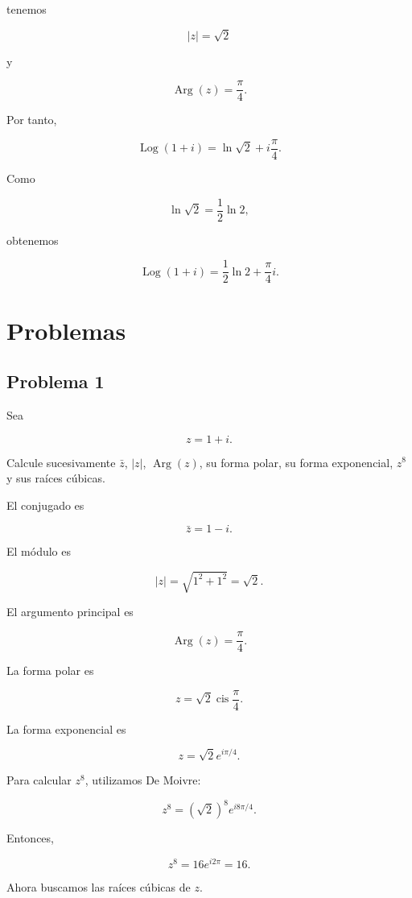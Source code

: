 \documentclass[12pt]{article}
\begin{document}
tenemos

\[
|z|=\sqrt2
\]

y

\[
\operatorname{Arg}(z)=\frac{\pi}{4}.
\]

Por tanto,

\[
\operatorname{Log}(1+i)
=
\ln\sqrt2
+
i\frac{\pi}{4}.
\]

Como

\[
\ln\sqrt2
=
\frac12\ln2,
\]

obtenemos

\[
\boxed{
\operatorname{Log}(1+i)
=
\frac12\ln2+\frac{\pi}{4}i
}.
\]

\section*{Problemas}

\subsection*{Problema 1}

Sea

\[
z=1+i.
\]

Calcule sucesivamente \(\bar z\), \(|z|\), \(\operatorname{Arg}(z)\),
su forma polar, su forma exponencial, \(z^8\) y sus raíces cúbicas.

El conjugado es

\[
\boxed{\bar z=1-i}.
\]

El módulo es

\[
|z|
=
\sqrt{1^2+1^2}
=
\boxed{\sqrt2}.
\]

El argumento principal es

\[
\boxed{
\operatorname{Arg}(z)=\frac{\pi}{4}
}.
\]

La forma polar es

\[
\boxed{
z
=
\sqrt2
\operatorname{cis}\frac{\pi}{4}
}.
\]

La forma exponencial es

\[
\boxed{
z
=
\sqrt2 e^{i\pi/4}
}.
\]

Para calcular \(z^8\), utilizamos De Moivre:

\[
z^8
=
(\sqrt2)^8
e^{i8\pi/4}.
\]

Entonces,

\[
z^8
=
16e^{i2\pi}
=
\boxed{16}.
\]

Ahora buscamos las raíces cúbicas de \(z\).
\end{document}
